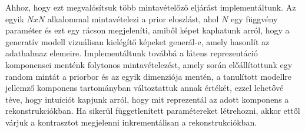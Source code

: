 \documentclass[12pt, english]{article}
\begin{document}
\vspace{4mm}

\par Ahhoz, hogy ezt megvalósítsuk több mintavételőző eljárást implementáltunk. Az egyik $N x N$ alkalommal mintavételezi a prior eloszlást, ahol $N$ egy függvény paraméter és ezt egy rácson megjeleníti, amiből képet kaphatunk arról, hogy a generatív modell vizuálisan kielégítő képeket generál-e, amely hasonlít az adathalmaz elemeire. Implementáltunk továbbá a látens reprezentáció komponensei menténk folytonos mintavételezést, amely során előállítottunk egy random mintát a priorbor és az egyik dimenziója mentén, a tanulított modellre jellemző komponens tartományban változtattuk annak értékét, ezzel lehetővé téve, hogy intuíciót kapjunk arról, hogy mit reprezentál az adott komponens a rekonstrukciókban. Ha sikerül függetlenített paramétereket létrehozni, akkor ettől várjuk a kontrasztot megjelenni inkrementálisan a rekonstrukciókban.

\vspace{4mm}
\end{document}

